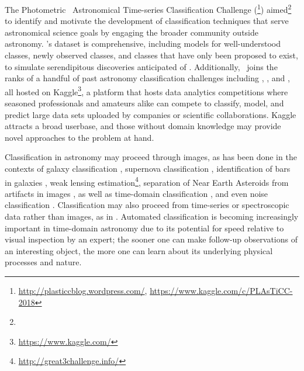 The Photometric \lsst\ Astronomical Time-series Classification Challenge (\plasticc\footnote{\url{http://plasticcblog.wordpress.com/}, \url{https://www.kaggle.com/c/PLAsTiCC-2018}}) aimed\footnote{}
to identify and motivate the development of classification techniques that serve astronomical science goals by engaging the broader community outside astronomy.
\plasticc's dataset is comprehensive, including models for well-understood classes, newly observed classes, and classes that have only been proposed to exist, to simulate serendipitous discoveries anticipated of \lsst \citep{the_plasticc_team_photometric_2018, kessler_models_2019}.
Additionally, \plasticc\ joins the ranks of a handful of past astronomy classification challenges including \citep[Mapping Dark Matter\footnote{\url{https://www.kaggle.com/c/mdm}}]{kitching_gravitational_2011}, \citep[Observing Dark Worlds\footnote{\url{https://www.kaggle.com/c/DarkWorlds}}]{harvey_observing_2013}, and \citep[the Galaxy Challenge\footnote{\url{https://www.kaggle.com/c/galaxy-zoo-the-galaxy-challenge}}]{dieleman_rotation-invariant_2015}, all hosted on Kaggle\footnote{\url{https://www.kaggle.com/}}, a platform that hosts data analytics competitions where seasoned professionals and amateurs alike can compete to classify, model, and predict large data sets uploaded by companies or scientific collaborations.
Kaggle attracts a broad userbase, and those without domain knowledge may provide novel approaches to the problem at hand.

Classification in astronomy may proceed through images, as has been done in the contexts of galaxy classification \citep{hoyle_measuring_2016}, supernova classification \citep{cabrera-vives_deep-hits:_2017}, identification of bars in galaxies \citep{abraham_detection_2018}, weak lensing estimation\footnote{\url{http://great3challenge.info/}}\citep{mandelbaum_third_2014}, separation of Near Earth Asteroids from artifacts in images \citep{morii_machine-learning_2016}, as well as  time-domain classification \citep{morii_machine-learning_2016, mahabal_deep-learnt_2017, zevin_gravity_2017}, and even noise classification \citep{zevin_gravity_2017, george_classification_2018}.
Classification may also proceed from time-series or spectroscopic data rather than images, as in \citet{newling_statistical_2011, richards_construction_2012, ishida_kernel_2013, richards_bayesian_2015, armstrong_k2_2016, lochner_photometric_2016, moller_photometric_2016}.
Automated classification \citep{mahabal_automated_2008, djorgovski_towards_2011, bloom_automating_2012, djorgovski_flashes_2012, narayan_machine_2018} is becoming increasingly important in time-domain astronomy due to its potential for speed relative to visual inspection by an expert; the sooner one can make follow-up observations of an interesting object, the more one can learn about its underlying physical processes and nature.

